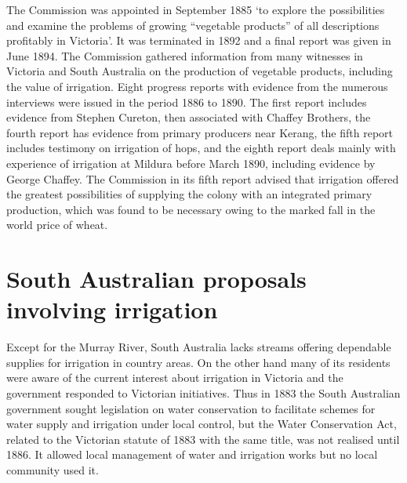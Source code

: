 The Commission was appointed in September 1885 `to explore the
possibilities and examine the problems of growing ``vegetable
products'' of all descriptions profitably in Victoria'.  It was
terminated in 1892 and a final report was given in June 1894.  The
Commission gathered information from many witnesses in Victoria and
South Australia on the production of vegetable products, including the
value of irrigation.  Eight progress reports with evidence from the
numerous interviews were issued in the period 1886 to 1890.  The first
report includes evidence from Stephen Cureton, 
then associated with Chaffey Brothers,  the fourth
report has evidence from primary producers near Kerang, the fifth
report includes testimony on irrigation of hops, and the eighth report
deals mainly with experience of irrigation at Mildura   before March 1890, including evidence by George
Chaffey.   The Commission in its fifth report
advised that irrigation offered the greatest possibilities of
supplying the colony with an integrated primary production, which was
found to be necessary owing to the marked fall in the world price of
wheat.

\section*{South Australian proposals involving irrigation}

Except for the Murray River, South Australia lacks streams offering
dependable supplies for irrigation in country areas.  On the other
hand many of its residents were aware of the current interest about
irrigation in Victoria and the government responded to Victorian
initiatives.  Thus in 1883 the South Australian government sought
legislation on water conservation to facilitate schemes for water
supply and irrigation under local control, but the Water Conservation
Act,  related to the
Victorian statute of 1883 with the same title, was not realised until
1886.  It allowed local management of water and irrigation works but
no local community used it.

